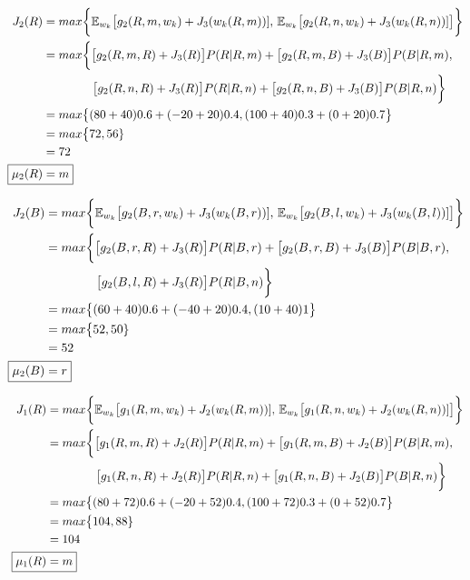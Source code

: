\documentclass[11pt, oneside]{article}   	%
\begin{document}
\begin{align*}
J_{2}(R) &= max \bigg\{ \mathbb{E}_{w_{k}} \big[ g_{2}(R,m,w_{k}) + J_{3}(w_{k}(R,m))], \, \mathbb{E}_{w_{k}} \big[ g_{2}(R,n,w_{k}) + J_{3}(w_{k}(R,n))] \big] \bigg\}\\
&= max \bigg\{ \big[g_{2}(R,m,R) + J_{3}(R)\big]P(R|R,m) + \big[g_{2}(R,m,B) + J_{3}(B)\big]P(B|R,m),\\
& \quad \quad \quad \quad \, \big[g_{2}(R,n,R) + J_{3}(R)\big]P(R|R,n) + \big[g_{2}(R,n,B) + J_{3}(B)\big]P(B|R,n) \bigg\}\\
&= max \big\{ (80+40)0.6+(-20+20)0.4, (100+40)0.3+(0+20)0.7 \big\}\\
&= max \big\{72,56\}\\
&= 72\\
\Aboxed{\mu_{2}(R)&=m}\\
\end{align*}

\begin{align*}
J_{2}(B) &= max \bigg\{ \mathbb{E}_{w_{k}} \big[ g_{2}(B,r,w_{k}) + J_{3}(w_{k}(B,r))], \, \mathbb{E}_{w_{k}} \big[ g_{2}(B,l,w_{k}) + J_{3}(w_{k}(B,l))] \big] \bigg\}\\
&= max \bigg\{ \big[g_{2}(B,r,R) + J_{3}(R)\big]P(R|B,r) + \big[g_{2}(B,r,B) + J_{3}(B)\big]P(B|B,r),\\
& \quad \quad \quad \quad \, \big[g_{2}(B,l,R) + J_{3}(R)\big]P(R|B,n) \bigg\}\\
&= max \big\{ (60+40)0.6+(-40+20)0.4, (10+40)1 \big\}\\
&= max \big\{52,50\}\\
&= 52\\
\Aboxed{\mu_{2}(B)&=r}\\
\end{align*}

\begin{align*}
J_{1}(R) &= max \bigg\{ \mathbb{E}_{w_{k}} \big[ g_{1}(R,m,w_{k}) + J_{2}(w_{k}(R,m))], \, \mathbb{E}_{w_{k}} \big[ g_{1}(R,n,w_{k}) + J_{2}(w_{k}(R,n))] \big] \bigg\}\\
&= max \bigg\{ \big[g_{1}(R,m,R) + J_{2}(R)\big]P(R|R,m) + \big[g_{1}(R,m,B) + J_{2}(B)\big]P(B|R,m),\\
& \quad \quad \quad \quad \, \big[g_{1}(R,n,R) + J_{2}(R)\big]P(R|R,n) + \big[g_{1}(R,n,B) + J_{2}(B)\big]P(B|R,n) \bigg\}\\
&= max \big\{ (80+72)0.6+(-20+52)0.4, (100+72)0.3+(0+52)0.7 \big\}\\
&= max \big\{104,88\}\\
&= 104\\\
\Aboxed{\mu_{1}(R)&=m}\\
\end{align*}
\end{document}

